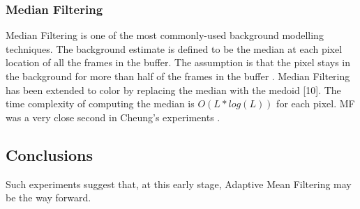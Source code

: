\subsubsection{Median Filtering}
Median Filtering is one of the most commonly-used background modelling techniques. The background estimate is defined to be the median at each pixel location of all the frames in the buffer. The assumption is that the pixel stays in the background for more than half of the frames in the buffer \cite{Cheung2007}. Median Filtering has been extended to color by replacing the median with the medoid [10]. The time complexity of computing the median is $O(L*log(L))$ for each pixel. MF was a very close second in Cheung's experiments \cite{Cheung2007}.

\subsection{Conclusions}
Such experiments suggest that, at this early stage, Adaptive Mean Filtering may be the way forward.\\